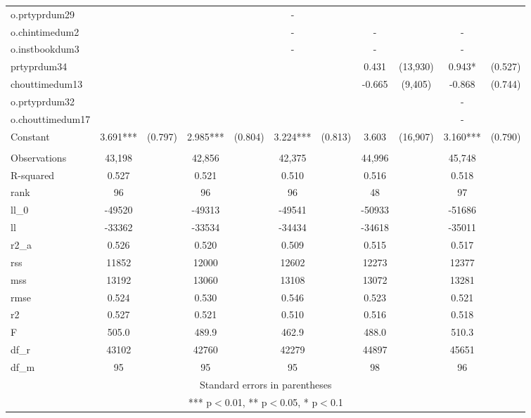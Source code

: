\documentclass[]{article}
\begin{document}
\begin{tabular}{lcccccccccc}
o.prtyprdum29 &  &  &  &  & - &  &  &  &  &  \\
o.chintimedum2 &  &  &  &  & - &  & - &  & - &  \\
o.instbookdum3 &  &  &  &  & - &  & - &  & - &  \\
prtyprdum34 &  &  &  &  &  &  & 0.431 & (13,930) & 0.943* & (0.527) \\
chouttimedum13 &  &  &  &  &  &  & -0.665 & (9,405) & -0.868 & (0.744) \\
o.prtyprdum32 &  &  &  &  &  &  &  &  & - &  \\
o.chouttimedum17 &  &  &  &  &  &  &  &  & - &  \\
Constant & 3.691*** & (0.797) & 2.985*** & (0.804) & 3.224*** & (0.813) & 3.603 & (16,907) & 3.160*** & (0.790) \\
 &  &  &  &  &  &  &  &  &  &  \\
Observations & 43,198 &  & 42,856 &  & 42,375 &  & 44,996 &  & 45,748 &  \\
R-squared & 0.527 &  & 0.521 &  & 0.510 &  & 0.516 &  & 0.518 &  \\
rank & 96 &  & 96 &  & 96 &  & 48 &  & 97 &  \\
ll\_0 & -49520 &  & -49313 &  & -49541 &  & -50933 &  & -51686 &  \\
ll & -33362 &  & -33534 &  & -34434 &  & -34618 &  & -35011 &  \\
r2\_a & 0.526 &  & 0.520 &  & 0.509 &  & 0.515 &  & 0.517 &  \\
rss & 11852 &  & 12000 &  & 12602 &  & 12273 &  & 12377 &  \\
mss & 13192 &  & 13060 &  & 13108 &  & 13072 &  & 13281 &  \\
rmse & 0.524 &  & 0.530 &  & 0.546 &  & 0.523 &  & 0.521 &  \\
r2 & 0.527 &  & 0.521 &  & 0.510 &  & 0.516 &  & 0.518 &  \\
F & 505.0 &  & 489.9 &  & 462.9 &  & 488.0 &  & 510.3 &  \\
df\_r & 43102 &  & 42760 &  & 42279 &  & 44897 &  & 45651 &  \\
 df\_m & 95 &  & 95 &  & 95 &  & 98 &  & 96 &  \\ \hline
\multicolumn{11}{c}{ Standard errors in parentheses} \\
\multicolumn{11}{c}{ *** p$<$0.01, ** p$<$0.05, * p$<$0.1} \\
\end{tabular}
\end{document}
